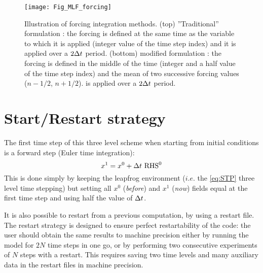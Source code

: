 \documentclass[../tex_main/NEMO_manual]{subfiles}
\begin{document}
\begin{figure}[!t] 	  \begin{center}
\texttt{[image: Fig\_MLF\_forcing]}
\caption{ 	\protect\label{fig:MLF_forcing}
Illustration of forcing integration methods. 
(top) ''Traditional'' formulation : the forcing is defined at the same time as the variable 
to which it is applied (integer value of the time step index) and it is applied over a $2\Delta t$ period. 
(bottom)  modified formulation : the forcing is defined in the middle of the time (integer and a half 
value of the time step index) and the mean of two successive forcing values ($n-1/2$, $n+1/2$).
is applied over a $2\Delta t$ period.}
\end{center}   \end{figure}

\section{Start/Restart strategy}
\label{sec:STP_rst}


The first time step of this three level scheme when starting from initial conditions 
is a forward step (Euler time integration): 
\begin{equation} \label{eq:DOM_euler}
	x^1 = x^0 + \Delta t \ \text{RHS}^0
\end{equation}
This is done simply by keeping the leapfrog environment ($i.e.$ the \autoref{eq:STP} 
three level time stepping) but setting all $x^0$ (\textit{before}) and $x^{1}$ (\textit{now}) fields 
equal at the first time step and using half the value of $\Delta t$.

It is also possible to restart from a previous computation, by using a 
restart file. The restart strategy is designed to ensure perfect 
restartability of the code: the user should obtain the same results to 
machine precision either by running the model for $2N$ time steps in one go, 
or by performing two consecutive experiments of $N$ steps with a restart. 
This requires saving two time levels and many auxiliary data in the restart 
files in machine precision. 
\end{document}
